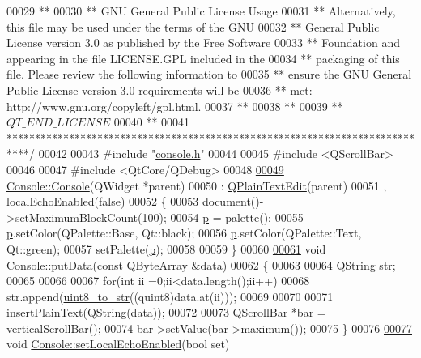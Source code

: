 \begin{DoxyCode}
00029 \textcolor{comment}{**}
00030 \textcolor{comment}{** GNU General Public License Usage}
00031 \textcolor{comment}{** Alternatively, this file may be used under the terms of the GNU}
00032 \textcolor{comment}{** General Public License version 3.0 as published by the Free Software}
00033 \textcolor{comment}{** Foundation and appearing in the file LICENSE.GPL included in the}
00034 \textcolor{comment}{** packaging of this file.  Please review the following information to}
00035 \textcolor{comment}{** ensure the GNU General Public License version 3.0 requirements will be}
00036 \textcolor{comment}{** met: http://www.gnu.org/copyleft/gpl.html.}
00037 \textcolor{comment}{**}
00038 \textcolor{comment}{**}
00039 \textcolor{comment}{** $QT\_END\_LICENSE$}
00040 \textcolor{comment}{**}
00041 \textcolor{comment}{****************************************************************************/}
00042 
00043 \textcolor{preprocessor}{#include "\hyperlink{a00088}{console.h}"}
00044 
00045 \textcolor{preprocessor}{#include <QScrollBar>}
00046 
00047 \textcolor{preprocessor}{#include <QtCore/QDebug>}
00048 
\hypertarget{a00087_source_l00049}{}\hyperlink{a00005_a1219e6e2000327a02434c56c514bbeda}{00049} \hyperlink{a00005_a1219e6e2000327a02434c56c514bbeda}{Console::Console}(QWidget *parent)
00050     : \hyperlink{a00061}{QPlainTextEdit}(parent)
00051     , localEchoEnabled(false)
00052 \{
00053     document()->setMaximumBlockCount(100);
00054     \hyperlink{a00005_a097b52858dc4b9f1bec8d8d67518daf0}{p} = palette();
00055     \hyperlink{a00005_a097b52858dc4b9f1bec8d8d67518daf0}{p}.setColor(QPalette::Base, Qt::black);
00056     \hyperlink{a00005_a097b52858dc4b9f1bec8d8d67518daf0}{p}.setColor(QPalette::Text, Qt::green);
00057     setPalette(\hyperlink{a00005_a097b52858dc4b9f1bec8d8d67518daf0}{p});
00058 
00059 \}
00060 
\hypertarget{a00087_source_l00061}{}\hyperlink{a00005_aa744a0868e01a13a502710f895f01525}{00061} \textcolor{keywordtype}{void} \hyperlink{a00005_aa744a0868e01a13a502710f895f01525}{Console::putData}(\textcolor{keyword}{const} QByteArray &data)
00062 \{
00063 
00064     QString str;
00065 
00066 
00067     \textcolor{keywordflow}{for}(\textcolor{keywordtype}{int} ii =0;ii<data.length();ii++)
00068         str.append(\hyperlink{a00005_a9194022b884875614a4f7056454881c1}{uint8\_to\_str}((quint8)data.at(ii)));
00069 
00070 
00071     insertPlainText(QString(data));
00072 
00073     QScrollBar *bar = verticalScrollBar();
00074     bar->setValue(bar->maximum());
00075 \}
00076 
\hypertarget{a00087_source_l00077}{}\hyperlink{a00005_a5a17c5b6bc6719a26f73a5d0ac3d7de1}{00077} \textcolor{keywordtype}{void} \hyperlink{a00005_a5a17c5b6bc6719a26f73a5d0ac3d7de1}{Console::setLocalEchoEnabled}(\textcolor{keywordtype}{bool} set)

\end{DoxyCode}

